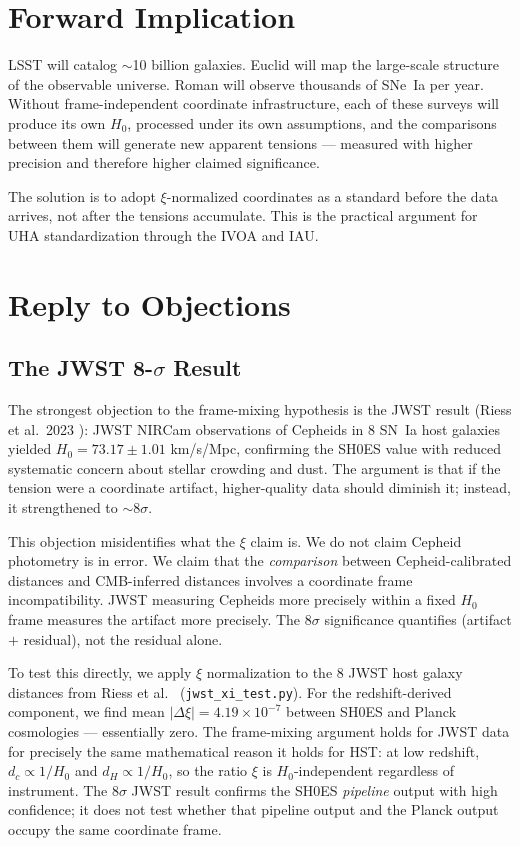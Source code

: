 \documentclass[12pt,a4paper]{article}
\begin{document}
\section{Forward Implication}

LSST will catalog $\sim$10 billion galaxies. Euclid will map the large-scale
structure of the observable universe. Roman will observe thousands of SNe~Ia
per year. Without frame-independent coordinate infrastructure, each of these
surveys will produce its own $H_0$, processed under its own assumptions, and
the comparisons between them will generate new apparent tensions --- measured
with higher precision and therefore higher claimed significance.

The solution is to adopt $\xi$-normalized coordinates as a standard before the
data arrives, not after the tensions accumulate. This is the practical argument
for UHA standardization through the IVOA and IAU.

\section{Reply to Objections}

\subsection{The JWST 8-$\sigma$ Result}

The strongest objection to the frame-mixing hypothesis is the JWST result
(Riess et al.\ 2023 \citeyear{riess2023jwst}): JWST NIRCam observations
of Cepheids in 8 SN~Ia host galaxies yielded $H_0 = 73.17 \pm 1.01$
km/s/Mpc, confirming the SH0ES value with reduced systematic concern
about stellar crowding and dust. The argument is that if the tension were
a coordinate artifact, higher-quality data should diminish it; instead,
it strengthened to $\sim$8$\sigma$.

This objection misidentifies what the $\xi$ claim is. We do not claim
Cepheid photometry is in error. We claim that the \emph{comparison}
between Cepheid-calibrated distances and CMB-inferred distances involves
a coordinate frame incompatibility. JWST measuring Cepheids more
precisely within a fixed $H_0$ frame measures the artifact more
precisely. The 8$\sigma$ significance quantifies (artifact $+$ residual),
not the residual alone.

To test this directly, we apply $\xi$ normalization to the 8 JWST host
galaxy distances from Riess et al.\ \citeyear{riess2023jwst}
(\texttt{jwst\_xi\_test.py}). For the redshift-derived component, we find
mean $|\Delta\xi| = 4.19 \times 10^{-7}$ between SH0ES and Planck
cosmologies --- essentially zero. The frame-mixing argument holds for JWST
data for precisely the same mathematical reason it holds for HST: at low
redshift, $d_c \propto 1/H_0$ and $d_H \propto 1/H_0$, so the ratio
$\xi$ is $H_0$-independent regardless of instrument. The 8$\sigma$ JWST
result confirms the SH0ES \emph{pipeline} output with high confidence; it
does not test whether that pipeline output and the Planck output occupy
the same coordinate frame.
\end{document}
